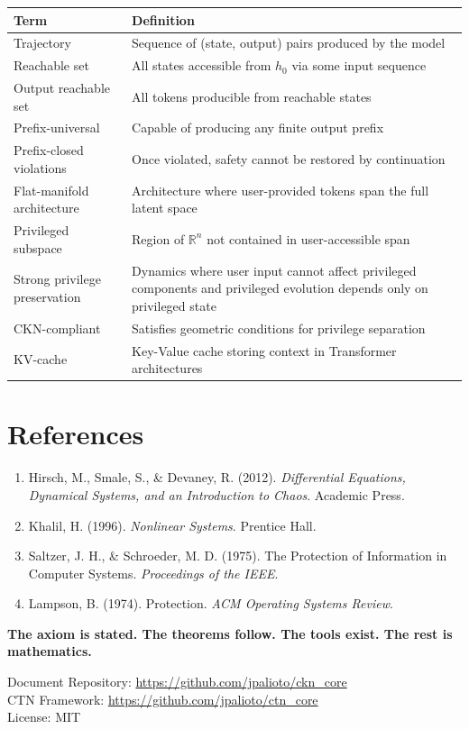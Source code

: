 \documentclass[11pt,a4paper]{article}
\begin{document}
\begin{table}[h]
\centering
\begin{tabular}{>{\raggedright}p{4cm} >{\raggedright\arraybackslash}p{9cm}}
\toprule
\textbf{Term} & \textbf{Definition} \\
\midrule
Trajectory & Sequence of (state, output) pairs produced by the model \\
Reachable set & All states accessible from $h_0$ via some input sequence \\
Output reachable set & All tokens producible from reachable states \\
Prefix-universal & Capable of producing any finite output prefix \\
Prefix-closed violations & Once violated, safety cannot be restored by continuation \\
Flat-manifold architecture & Architecture where user-provided tokens span the full latent space \\
Privileged subspace & Region of $\mathbb{R}^n$ not contained in user-accessible span \\
Strong privilege preservation & Dynamics where user input cannot affect privileged components and privileged evolution depends only on privileged state \\
CKN-compliant & Satisfies geometric conditions for privilege separation \\
KV-cache & Key-Value cache storing context in Transformer architectures \\
\bottomrule
\end{tabular}
\end{table}

\section*{References}

\begin{enumerate}
    \item Hirsch, M., Smale, S., \& Devaney, R. (2012). \textit{Differential Equations, Dynamical Systems, and an Introduction to Chaos}. Academic Press.
    \item Khalil, H. (1996). \textit{Nonlinear Systems}. Prentice Hall.
    \item Saltzer, J. H., \& Schroeder, M. D. (1975). The Protection of Information in Computer Systems. \textit{Proceedings of the IEEE}.
    \item Lampson, B. (1974). Protection. \textit{ACM Operating Systems Review}.
\end{enumerate}

\vspace{1cm}
\noindent\textbf{The axiom is stated. The theorems follow. The tools exist. The rest is mathematics.}

\vspace{0.5cm}
\noindent Document Repository: \url{https://github.com/jpalioto/ckn_core}\\
CTN Framework: \url{https://github.com/jpalioto/ctn_core}\\
License: MIT
\end{document}
